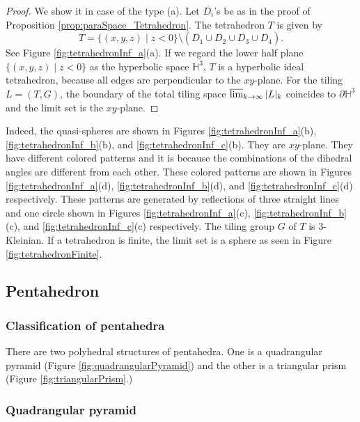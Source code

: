 \documentclass[suppldata, dvipdfmx]{interact}
\theoremstyle{plain}%
\theoremstyle{definition}
\theoremstyle{remark}
\theoremstyle{problemstyle}
\begin{document}
\begin{proof}
We show it in case of the type (a).  Let $\overline{D_i}$'s be as in the proof of Proposition \ref{prop:paraSpace_Tetrahedron}.  The tetrahedron $T$ is given by 
\[
T = \{(x,y,z) \mid z<0\} \setminus(\overline{D_1} \cup \overline{D_2} \cup \overline{D_3} \cup \overline{D_4}).
\]
See Figure \ref{fig:tetrahedronInf_a}(a).  If we regard the lower half plane $\{(x,y,z) \mid z<0\}$ as the hyperbolic space $\mathbb{H}^3$, $T$ is a hyperbolic ideal tetrahedron, because all edges are perpendicular to the $xy$-plane.  For the tiling $L=(T,G)$, the boundary of the total tiling space $\varlimsup_{k\to\infty} |L|_k$
coincides to $\partial{\mathbb{H}^3}$ and the limit set is the $xy$-plane.
\end{proof}

Indeed, the quasi-spheres are shown in Figures \ref{fig:tetrahedronInf_a}(b), \ref{fig:tetrahedronInf_b}(b),
and \ref{fig:tetrahedronInf_c}(b).  They are $xy$-plane.  They have different colored patterns and it is because the combinations of the dihedral angles are different from each other.  These colored patterns are shown in Figures  \ref{fig:tetrahedronInf_a}(d), \ref{fig:tetrahedronInf_b}(d),
and \ref{fig:tetrahedronInf_c}(d) respectively.  These patterns are generated by reflections of three straight lines and one circle shown in Figures \ref{fig:tetrahedronInf_a}(c), \ref{fig:tetrahedronInf_b}(c),
and \ref{fig:tetrahedronInf_c}(c) respectively.  The tiling group $G$ of $T$ is 3-Kleinian.  If a tetrahedron is finite, the limit set is a sphere as seen in Figure \ref{fig:tetrahedronFinite}.

\subsection{Pentahedron}

\subsubsection{Classification of pentahedra}

There are two polyhedral structures of pentahedra. One is a quadrangular pyramid (Figure \ref{fig:quadrangularPyramid}) and the other is a triangular prism (Figure \ref{fig:triangularPrism}.)

\subsubsection{Quadrangular pyramid}
\end{document}
